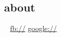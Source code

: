 \documentclass[]{fancy-cv}
\begin{document}
\header{\myfirstname}{\mylastname}
       {\mytitle}

\begin{aside}
  \section{about}
    \myaddress
    \mycity
    ~
    \href{mailto:\myemail}{\myemail}
    \href{\mywebsite}{\mywebsite}
    \href{http://facebook.com/\myfb}{fb://\myfb}
    \href{http://plug.google.com/\mygp}{google://\mygp}
\end{aside}
\end{document}
